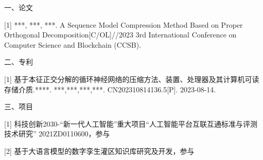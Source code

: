 \begin{publications}


{\heiti 一、论文}

[1] ***, ***, ***. A Sequence Model Compression Method Based on Proper Orthogonal Decomposition[C/OL]//2023 3rd International Conference on Computer Science and Blockchain (CCSB). 

{\heiti 二、专利}

[1] 基于本征正交分解的循环神经网络的压缩方法、装置、处理器及其计算机可读存储介质.****. ***,***,***,***. CN202310814136.5[P]. 2023-08-14.


{\heiti 三、项目}

[1] 科技创新2030-“新一代人工智能”重大项目“人工智能平台互联互通标准与评测技术研究” 2021ZD0110600，参与

[2] 基于大语言模型的数字孪生灌区知识库研究及开发，参与


\end{publications}
